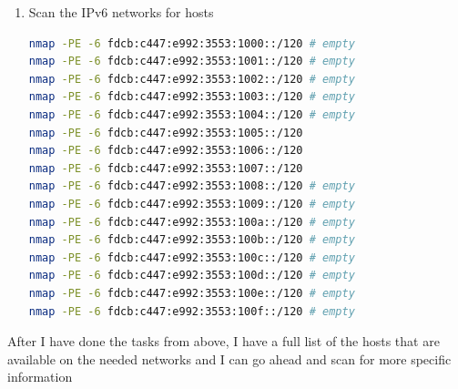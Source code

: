 \begin{enumerate}
    \item Scan the IPv6 networks for hosts
    \begin{lstlisting}[language=bash,numbers=none]
nmap -PE -6 fdcb:c447:e992:3553:1000::/120 # empty
nmap -PE -6 fdcb:c447:e992:3553:1001::/120 # empty
nmap -PE -6 fdcb:c447:e992:3553:1002::/120 # empty
nmap -PE -6 fdcb:c447:e992:3553:1003::/120 # empty
nmap -PE -6 fdcb:c447:e992:3553:1004::/120 # empty
nmap -PE -6 fdcb:c447:e992:3553:1005::/120
nmap -PE -6 fdcb:c447:e992:3553:1006::/120
nmap -PE -6 fdcb:c447:e992:3553:1007::/120
nmap -PE -6 fdcb:c447:e992:3553:1008::/120 # empty
nmap -PE -6 fdcb:c447:e992:3553:1009::/120 # empty
nmap -PE -6 fdcb:c447:e992:3553:100a::/120 # empty
nmap -PE -6 fdcb:c447:e992:3553:100b::/120 # empty
nmap -PE -6 fdcb:c447:e992:3553:100c::/120 # empty
nmap -PE -6 fdcb:c447:e992:3553:100d::/120 # empty
nmap -PE -6 fdcb:c447:e992:3553:100e::/120 # empty
nmap -PE -6 fdcb:c447:e992:3553:100f::/120 # empty
    \end{lstlisting}
\end{enumerate}

After I have done the tasks from above, I have a full list of the hosts that are available on the needed networks
and I can go ahead and scan for more specific information

